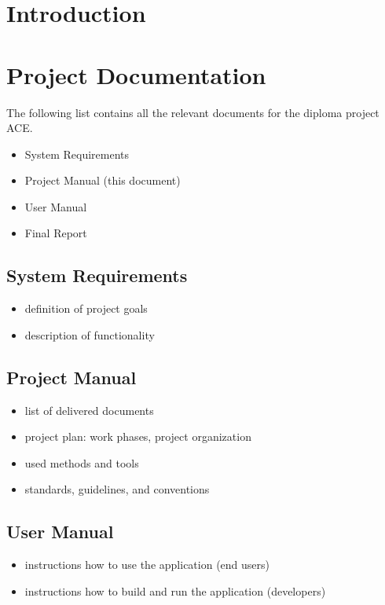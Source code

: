 \documentclass[11pt,a4paper]{article}
\begin{document}
\setlength{\parindent}{0pt}



\tableofcontents

\newpage

\section{Introduction}

\section{Project Documentation}
The following list contains all the relevant documents for the diploma project ACE.
\begin{itemize}
 \item System Requirements
 \item Project Manual (this document)
 \item User Manual
 \item Final Report
\end{itemize}

\subsection{System Requirements}
\begin{itemize}
 \item definition of project goals
 \item description of functionality
\end{itemize}

\subsection{Project Manual}
\begin{itemize}
 \item list of delivered documents
 \item project plan: work phases, project organization
 \item used methods and tools
 \item standards, guidelines, and conventions
\end{itemize}

\subsection{User Manual}
\begin{itemize}
 \item instructions how to use the application (end users)
 \item instructions how to build and run the application (developers)
\end{itemize}
\end{document}
